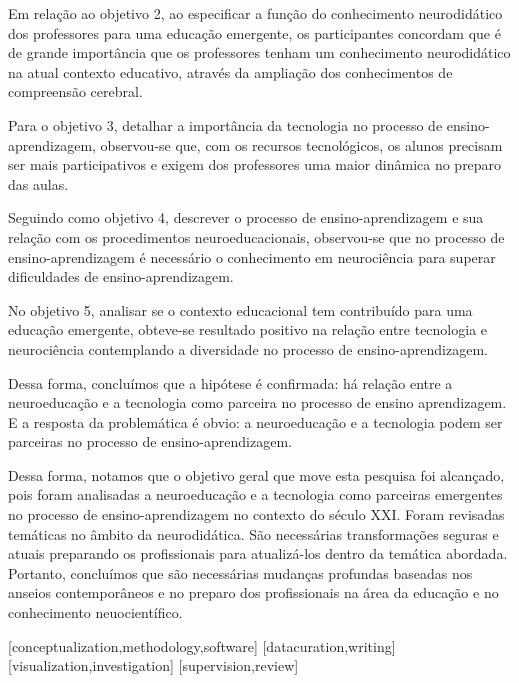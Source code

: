 \documentclass[portuguese]{textolivre}
\begin{document}
Em relação ao objetivo 2, ao especificar a função do conhecimento neurodidático dos professores para uma educação emergente, os participantes concordam que é de grande importância que os professores tenham um conhecimento neurodidático na atual contexto educativo, através da ampliação dos conhecimentos de compreensão cerebral. 

Para o objetivo 3, detalhar a importância da tecnologia no processo de ensino-aprendizagem, observou-se que, com os recursos tecnológicos, os alunos precisam ser mais participativos e exigem dos professores uma maior dinâmica no preparo das aulas.

Seguindo como objetivo 4, descrever o processo de ensino-aprendizagem e sua relação com os procedimentos neuroeducacionais, observou-se que no processo de ensino-aprendizagem é necessário o conhecimento em neurociência para superar dificuldades de ensino-aprendizagem.

No objetivo 5, analisar se o contexto educacional tem contribuído para uma educação emergente, obteve-se resultado positivo na relação entre tecnologia e neurociência contemplando a diversidade no processo de ensino-aprendizagem.

Dessa forma, concluímos que a hipótese é confirmada: há relação entre a neuroeducação e a tecnologia como parceira no processo de ensino aprendizagem. E a resposta da problemática é obvio: a neuroeducação e a tecnologia podem ser parceiras no processo de ensino-aprendizagem.

Dessa forma, notamos que o objetivo geral que move esta pesquisa foi alcançado, pois foram analisadas a neuroeducação e a tecnologia como parceiras emergentes no processo de ensino-aprendizagem no contexto do século XXI. Foram revisadas temáticas no âmbito da neurodidática. São necessárias transformações seguras e atuais preparando os profissionais para atualizá-los dentro da temática abordada. Portanto, concluímos que são necessárias mudanças profundas baseadas nos anseios contemporâneos e no preparo dos profissionais na área da educação e no conhecimento neuocientífico.


\printbibliography\label{sec-bib}


\begin{contributors}
[conceptualization,methodology,software]
[datacuration,writing]
[visualization,investigation]
[supervision,review]
\end{contributors}
\end{document}

